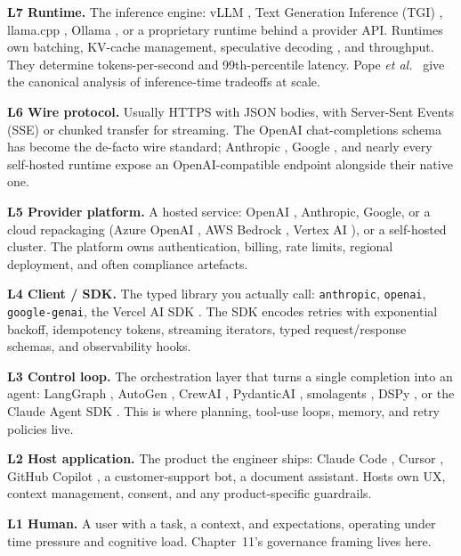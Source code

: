\textbf{L7 Runtime.} The inference engine: vLLM
\citep{kwon2023vllm, vllm_docs}, Text Generation Inference (TGI)
\citep{tgi_docs}, llama.cpp \citep{llamacpp_docs}, Ollama
\citep{ollama_docs}, or a proprietary runtime behind a provider
API. Runtimes own batching, KV-cache management, speculative
decoding \citep{leviathan2023speculative}, and throughput. They
determine tokens-per-second and 99th-percentile latency. Pope
\emph{et al.}\ \citep{pope2023efficiently} give the canonical
analysis of inference-time tradeoffs at scale.

\textbf{L6 Wire protocol.} Usually HTTPS with JSON bodies, with
Server-Sent Events (SSE) or chunked transfer for streaming. The
OpenAI chat-completions schema has become the de-facto wire
standard; Anthropic \citep{anthropic_api_docs}, Google
\citep{google_gemini_api}, and nearly every self-hosted runtime
expose an OpenAI-compatible endpoint alongside their native one.

\textbf{L5 Provider platform.} A hosted service: OpenAI
\citep{openai_api_docs}, Anthropic, Google, or a cloud repackaging
(Azure OpenAI \citep{azure_openai_docs}, AWS Bedrock
\citep{aws_bedrock_docs}, Vertex AI \citep{gcp_vertex_docs}), or a
self-hosted cluster. The platform owns authentication, billing,
rate limits, regional deployment, and often compliance artefacts.

\textbf{L4 Client / SDK.} The typed library you actually call:
\texttt{anthropic}, \texttt{openai}, \texttt{google-genai}, the
Vercel AI SDK \citep{vercel_ai_sdk}. The SDK encodes retries with
exponential backoff, idempotency tokens, streaming iterators,
typed request/response schemas, and observability hooks.

\textbf{L3 Control loop.} The orchestration layer that turns a
single completion into an agent: LangGraph \citep{langgraph_docs},
AutoGen \citep{wu2023autogen}, CrewAI \citep{crewai_docs},
PydanticAI \citep{pydantic_ai_docs}, smolagents
\citep{smolagents_docs}, DSPy \citep{khattab2023dspy}, or the
Claude Agent SDK \citep{anthropic_agent_sdk}. This is where
planning, tool-use loops, memory, and retry policies live.

\textbf{L2 Host application.} The product the engineer ships:
Claude Code \citep{claude_code}, Cursor \citep{cursor_editor},
GitHub Copilot \citep{github_copilot}, a customer-support bot, a
document assistant. Hosts own UX, context management, consent,
and any product-specific guardrails.

\textbf{L1 Human.} A user with a task, a context, and
expectations, operating under time pressure and cognitive load.
Chapter~11's governance framing lives here.

